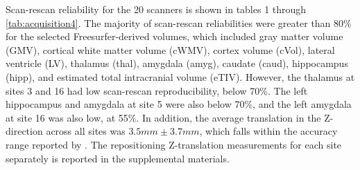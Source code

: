 Scan-rescan reliability for the 20 scanners is shown in tables 1 through \ref{tab:acquisition4}. The majority of scan-rescan reliabilities were greater than 80\% for the selected Freesurfer-derived volumes, which included gray matter volume (GMV), cortical white matter volume (cWMV), cortex volume (cVol), lateral ventricle (LV), thalamus (thal), amygdala (amyg), caudate (caud), hippocampus (hipp), and estimated total intracranial volume (eTIV). However, the thalamus at sites 3 and 16 had low scan-rescan reproducibility, below 70\%. The left hippocampus and amygdala at site 5 were also below 70\%, and the left amygdala at site 16 was also low, at 55\%. In addition, the average translation in the Z-direction across all sites was $3.5mm \pm 3.7mm$, which falls within the accuracy range reported by \cite{caramanos2010gradient}. The repositioning Z-translation measurements for each site separately is reported in the supplemental materials.

